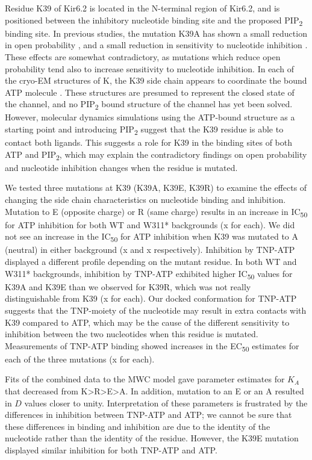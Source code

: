 Residue K39 of Kir6.2 is located in the N-terminal region of Kir6.2, and is positioned between the inhibitory nucleotide binding site and the proposed PIP\textsubscript{2} binding site.
In previous studies, the mutation K39A has shown a small reduction in open probability \cite{cukras_role_2002}, and a small reduction in sensitivity to nucleotide inhibition \cite{cukras_role_2002, tucker_molecular_1998}.
These effects are somewhat contradictory, as mutations which reduce open probability tend also to increase sensitivity to nucleotide inhibition.
In each of the cryo-EM structures of K\ATP{}, the K39 side chain appears to coordinate the bound ATP molecule \cite{lee_molecular_2017, martin_anti-diabetic_2017, li_structure_2017, puljung_cryo-electron_2018-1}.
These structures are presumed to represent the closed state of the channel, and no PIP\textsubscript{2} bound structure of the channel has yet been solved.
However, molecular dynamics simulations using the ATP-bound structure as a starting point and introducing PIP\textsubscript{2} suggest that the K39 residue is able to contact both ligands.
This suggests a role for K39 in the binding sites of both ATP and PIP\textsubscript{2}, which may explain the contradictory findings on open probability and nucleotide inhibition changes when the residue is mutated.

We tested three mutations at K39 (K39A, K39E, K39R) to examine the effects of changing the side chain characteristics on nucleotide binding and inhibition.
Mutation to E (opposite charge) or R (same charge) results in an increase in IC\textsubscript{50} for ATP inhibition for both WT and W311* backgrounds (x for each).
We did not see an increase in the IC\textsubscript{50} for ATP inhibition when K39 was mutated to A (neutral) in either background (x and x respectively).
Inhibition by TNP-ATP displayed a different profile depending on the mutant residue.
In both WT and W311* backgrounds, inhibition by TNP-ATP exhibited higher IC\textsubscript{50} values for K39A and K39E than we observed for K39R, which was not really distinguishable from K39 (x for each).
Our docked conformation for TNP-ATP suggests that the TNP-moiety of the nucleotide may result in extra contacts with K39 compared to ATP, which may be the cause of the different sensitivity to inhibition between the two nucleotides when this residue is mutated.
Measurements of TNP-ATP binding showed increases in the EC\textsubscript{50} estimates for each of the three mutations (x for each).

Fits of the combined data to the MWC model gave parameter estimates for $K_A$ that decreased from K>R>E>A.
In addition, mutation to an E or an A resulted in $D$ values closer to unity.
Interpretation of these parameters is frustrated by the differences in inhibition between TNP-ATP and ATP; we cannot be sure that these differences in binding and inhibition are due to the identity of the nucleotide rather than the identity of the residue.
However, the K39E mutation displayed similar inhibition for both TNP-ATP and ATP.


